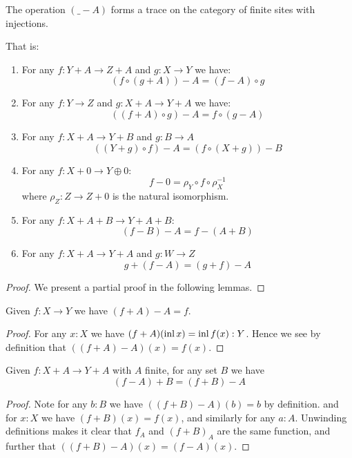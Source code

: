 \documentclass{article}
\begin{document}
\begin{theorem}
  The operation $(\_ - A)$ forms a trace on the category of finite sites with injections.

  That is:
  \begin{enumerate}
    \item For any $f : Y + A \to Z + A$ and $g : X \to Y$ we have: 
    \[ (f \circ (g + A)) - A = (f - A) \circ g \]
    \item For any $f : Y \to Z$ and $g : X + A \to Y + A$ we have: 
    \[ ((f + A) \circ g) - A = f \circ (g - A) \]
    \item 
    For any $f : X + A \to Y + B$ and $g : B \to A$
    \[ ((Y + g) \circ f) - A = (f \circ (X + g)) - B\]
    \item
    For any $f : X + 0 \to Y \oplus 0$:
    \[f - 0 = \rho_Y \circ f \circ \rho_X^{-1}\]
    where $\rho_Z : Z \to Z + 0$ is the natural isomorphism.
    \item 
    For any $f : X + A + B \to Y + A + B$:
    \[ (f - B) - A = f - (A + B)\]
    \item
    For any $f : X + A \to Y + A$ and $g : W \to Z$
    \[ g + (f - A) = (g + f) - A\]
  \end{enumerate}
\end{theorem}
\begin{proof}
  We present a partial proof in the following lemmas.
\end{proof}

\begin{lemma}
    Given $f : X \to Y$ we have $(f + A) - A = f$.
\end{lemma}
\begin{proof}
    For any $x : X$ we have $(f + A)(\operatorname{inl} x) = \operatorname{inl} f(x) : Y$.
    Hence we see by definition that  $((f + A) - A)(x) = f(x)$.
\end{proof}

\begin{lemma}
    Given $f : X + A \to Y + A$ with $A$ finite, for any set $B$ we have
    \[ (f - A) + B = (f + B) - A \]
\end{lemma}
\begin{proof}
    Note for any $b : B$ we have $((f + B) - A)(b) = b$ by definition.
    and for $x : X$ we have $(f + B)(x) = f(x)$, and similarly for any $a : A$. 
    Unwinding definitions makes it clear that $f_A$ and $(f + B)_A$ are the same function,
    and further that $((f + B) - A)(x) = (f - A)(x)$.
\end{proof}
\end{document}
